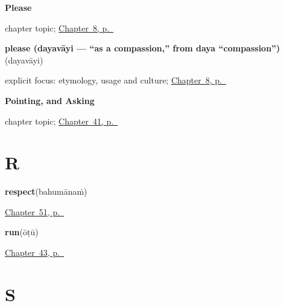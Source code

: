 \noindent\begin{minipage}[t]{\linewidth}
\raggedright
\textbf{Please}\par
\footnotesize chapter topic; \hyperref[ch:ml-please]{Chapter~8, p.~\pageref*{ch:ml-please}}
\end{minipage}\par\smallskip

\noindent\begin{minipage}[t]{\linewidth}
\raggedright
\textbf{please (dayavāyi — \textquotedblleft{}as a compassion,\textquotedblright{} from  daya \textquotedblleft{}compassion\textquotedblright{})}\enspace\emph{}\enspace(dayavāyi)\par
\footnotesize explicit focus: etymology, usage and culture; \hyperref[ch:ml-please]{Chapter~8, p.~\pageref*{ch:ml-please}}
\end{minipage}\par\smallskip

\noindent\begin{minipage}[t]{\linewidth}
\raggedright
\textbf{Pointing, and Asking}\par
\footnotesize chapter topic; \hyperref[ch:ml-pointing-and-asking]{Chapter~41, p.~\pageref*{ch:ml-pointing-and-asking}}
\end{minipage}\par\smallskip

\section*{R}

\noindent\begin{minipage}[t]{\linewidth}
\raggedright
\textbf{respect}\enspace\emph{}\enspace(bahumānaṁ)\par
\footnotesize \hyperref[ch:ml-courtesy]{Chapter~51, p.~\pageref*{ch:ml-courtesy}}
\end{minipage}\par\smallskip

\noindent\begin{minipage}[t]{\linewidth}
\raggedright
\textbf{run}\enspace\emph{}\enspace(ōṭū)\par
\footnotesize \hyperref[ch:ml-more-verbs]{Chapter~43, p.~\pageref*{ch:ml-more-verbs}}
\end{minipage}\par\smallskip

\section*{S}

